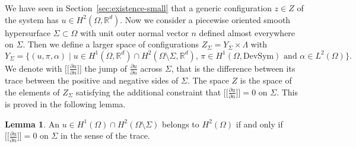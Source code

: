\documentclass[a4paper,10pt,oneside]{amsbook}
\numberwithin{section}{chapter}
\numberwithin{equation}{chapter}
\theoremstyle{definition}
\newtheorem{lemma}[prop]{Lemma}
\newcommand{\dind}[2]{\frac{\partial #1}{\partial #2}}
\begin{document}
We have seen in Section~\ref{sec:existence-small} that a generic configuration $z\in Z$ of the system has $u\in H^2(\Omega,\mathbb{R}^d)$. Now we consider a piecewise oriented smooth hypersurface $\Sigma\subset\Omega$ with unit outer normal vector $n$ defined almost everywhere on $\Sigma$. Then we define a larger space of configurations $Z_\Sigma=Y_\Sigma\times\Lambda$ with
\[
Y_\Sigma=\{(u,\pi,\alpha)\;|\;\text{$u\in H^1(\Omega,\mathbb{R}^d)\cap H^2(\Omega\setminus\Sigma,\mathbb{R}^d)$, $\pi\in H^1(\Omega,\text{DevSym})$ and $\alpha\in L^2(\Omega)$}\}.
\]
We denote with $\big[\!\!\big[\dind{u}{n}\big]\!\!\big]$ the jump of $\dind{u}{n}$ across $\Sigma$, that is the difference between its trace between the positive and negative sides of $\Sigma$. The space $Z$ is the space of the elements of $Z_\Sigma$ satisfying the additional constraint that $\big[\!\!\big[\dind{u}{n}\big]\!\!\big]=0$ on $\Sigma$. This is proved in the following lemma.
\begin{lemma}
An $u\in H^1(\Omega)\cap H^2(\Omega\setminus\Sigma)$ belongs to $H^2(\Omega)$ if and only if $\big[\!\!\big[\dind{u}{n}\big]\!\!\big]=0$ on $\Sigma$ in the sense of the trace.
\end{lemma}
\end{document}
